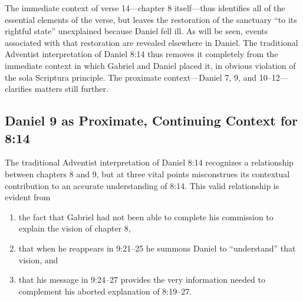 The immediate context of verse 14---chapter 8 itself---thus identifies all
of the essential elements of the verse, but leaves the restoration of
the sanctuary ``to its rightful state'' unexplained because Daniel fell
ill. As will be seen, events associated with that restoration are
revealed elsewhere in Daniel. The traditional Adventist interpretation of
Daniel 8:14 thus removes it completely from the immediate context in which
Gabriel and Daniel placed it, in obvious violation of the sola Scriptura 
principle. The proximate context---Daniel 7, 9, and 10--12---clarifies
matters still further.

\subsection{Daniel 9 as Proximate, Continuing Context for 8:14}

The traditional Adventist interpretation of Daniel 8:14 recognizes a
relationship between chapters 8 and 9, but at three vital points
misconstrues its contextual contribution to an accurate understanding of
8:14. This valid relationship is evident from
\begin{enumerate}
	\item the fact that
Gabriel had not been able to complete his commission to explain the vision
        of chapter 8, 
	\item that when he reappears in 9:21--25 he summons Daniel to
``understand'' that vision, and 
	\item that his message in 9:24--27 provides the
very information needed to complement his aborted explanation of 8:19--27.
\end{enumerate}

